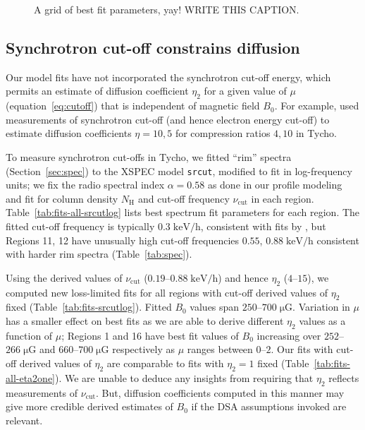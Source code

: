 \documentclass[iop, apj, numberedappendix]{emulateapj}
\newcommand*{\mt}{\mathrm}
\newcommand*{\unit}[1]{\;\mt{#1}}  %
\newcommand*{\muG}{\unit{\mu G}}
\begin{document}


\begin{figure*}%
    \caption{A grid of best fit parameters, yay!  WRITE THIS CAPTION.}
    \label{fig:pargrid}
\end{figure*}


\subsection{Synchrotron cut-off constrains diffusion}


Our model fits have not incorporated the synchrotron cut-off energy, which
permits an estimate of diffusion coefficient $\eta_2$ for a given value of
$\mu$ (equation~\eqref{eq:cutoff}) that is independent of magnetic field
$B_0$.  For example, \citet{parizot2006} used measurements of synchrotron
cut-off (and hence electron energy cut-off) to estimate diffusion coefficients
$\eta = 10, 5$ for compression ratios $4, 10$ in Tycho.

To measure synchrotron cut-offs in Tycho, we fitted ``rim'' spectra
(Section~\ref{sec:spec}) to the XSPEC model \texttt{srcut}, modified to fit in
log-frequency units; we fix the radio spectral index $\alpha = 0.58$
\citep{sun2011} as done in our profile modeling and fit for column density
$N_{\mt{H}}$ and cut-off frequency $\nu_{\mt{cut}}$ in each region.
Table~\ref{tab:fits-all-srcutlog} lists best spectrum fit parameters for each
region.  The fitted cut-off frequency is typically $0.3 \unit{keV/h}$,
consistent with fits by \citet{hwang2002}, but Regions 11, 12 have unusually
high cut-off frequencies $0.55$, $0.88 \unit{keV/h}$ consistent with harder rim
spectra (Table~\ref{tab:spec}).

Using the derived values of $\nu_{\mt{cut}}$ ($0.19$--$0.88 \unit{keV/h}$) and
hence $\eta_2$ ($4$--$15$), we computed new loss-limited fits for all regions
with cut-off derived values of $\eta_2$ fixed (Table~\ref{tab:fits-srcutlog}).
Fitted $B_0$ values span $250$--$700 \muG$.  Variation in $\mu$ has a smaller
effect on best fits as we are able to derive different $\eta_2$ values as a
function of $\mu$; Regions 1 and 16 have best fit values of $B_0$ increasing
over $252$--$266 \muG$ and $660$--$700 \muG$ respectively as $\mu$ ranges
between $0$--$2$.  Our fits with cut-off derived values of $\eta_2$ are
comparable to fits with $\eta_2 = 1$ fixed (Table~\ref{tab:fits-all-eta2one}).
We are unable to deduce any insights from requiring that $\eta_2$ reflects
measurements of $\nu_{\mt{cut}}$.  But, diffusion coefficients computed in this
manner may give more credible derived estimates of $B_0$ if the DSA assumptions
invoked are relevant.
\end{document}
